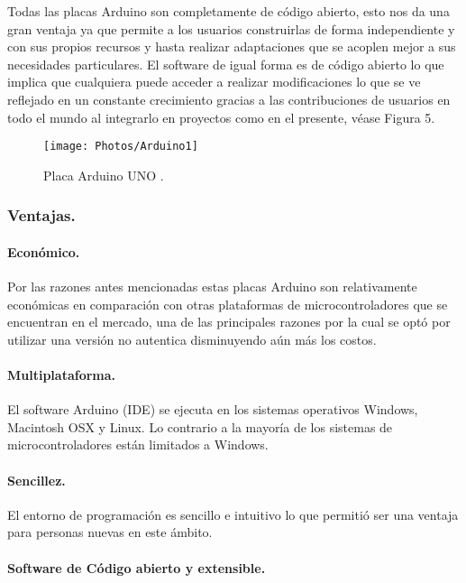 \documentclass[11pt,letter
								]
								{article}
\begin{document}
Todas las placas Arduino son completamente de código abierto, esto nos da una gran ventaja ya que  permite a los usuarios construirlas de forma independiente  y con sus propios recursos y hasta realizar adaptaciones que se acoplen mejor a sus necesidades  particulares. El software  de igual forma  es de código abierto lo que implica que cualquiera puede acceder a realizar modificaciones  lo que se ve reflejado en un  constante crecimiento gracias a las contribuciones  de usuarios en todo el mundo al integrarlo en proyectos como en el presente, véase Figura 5.

\begin{figure}[H]
\centering
\texttt{[image: Photos/Arduino1]}
\caption{Placa Arduino UNO \cite{ArduinoWeb}. } 
\label{ArduinoUNO}

\end{figure}


\subsubsection{Ventajas.}
\paragraph{Económico. }
Por las razones antes mencionadas estas  placas Arduino son relativamente económicas en comparación con otras plataformas de microcontroladores que se encuentran en el mercado, una de las principales razones por la cual se optó por utilizar una versión no autentica disminuyendo aún más los costos. 

\paragraph{Multiplataforma.}
El software Arduino (IDE) se ejecuta en los sistemas operativos Windows, Macintosh OSX y Linux.  Lo contrario a la mayoría de los sistemas de microcontroladores están limitados a Windows.

\paragraph{Sencillez.}

El entorno de programación es sencillo  e intuitivo lo que permitió ser una ventaja para  personas nuevas en este ámbito.

\paragraph{Software de Código abierto y extensible. }
\end{document}
